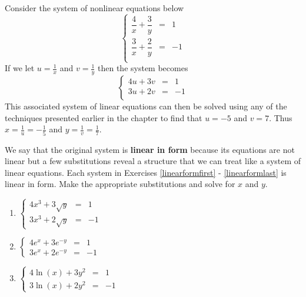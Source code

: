 Consider the system of nonlinear equations  below \[\left\{\begin{array}{rcr}  \dfrac{4}{x} + \dfrac{3}{y} & = & 1 \\[10pt] \dfrac{3}{x} + \dfrac{2}{y} & = & -1 \\ \end{array} \right.\]  If we let $u = \frac{1}{x}$ and $v = \frac{1}{y}$ then the system becomes \[\left\{\begin{array}{rcr}  4u + 3v & = & 1 \\ 3u + 2v & = & -1 \\ \end{array} \right.\] This associated system of linear equations can then be solved using any of the techniques presented earlier in the chapter to find that $u = -5$ and $v = 7$.  Thus $x = \frac{1}{u} = -\frac{1}{5}$ and $y = \frac{1}{v} = \frac{1}{7}$.  

\smallskip

We say that the original system is {\bf linear in form}  because its equations are not linear but a few substitutions reveal a structure that we can treat like a system of linear equations.  Each system in Exercises \ref{linearformfirst} - \ref{linearformlast}  is linear in form.  Make the appropriate substitutions and solve for $x$ and $y$.

\begin{multicols}{3}
\begin{enumerate}
\setcounter{enumi}{\value{HW}}

\item $\left\{\begin{array}{rcr}  4x^{3} + 3\sqrt{y} & = & 1 \\ 3x^{3} + 2\sqrt{y} & = & -1  \end{array} \right.$ \label{linearformfirst}
\item $\left\{\begin{array}{rcr}  4e^{x} + 3e^{-y} & = & 1 \\ 3e^{x} + 2e^{-y} & = & -1  \end{array} \right.$
\item $\left\{\begin{array}{rcr}  4\ln(x) + 3y^{2} & = & 1 \\ 3\ln(x) + 2y^{2} & = & -1 \end{array} \right.$ \label{linearformlast}

\setcounter{HW}{\value{enumi}}
\end{enumerate}
\end{multicols}

